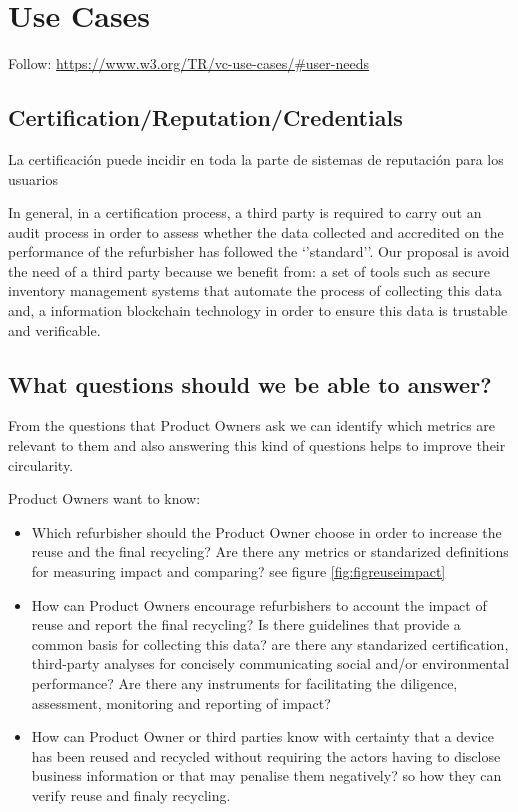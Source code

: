 \documentclass[
]{book}
\providecommand{\tightlist}{%
  \setlength{\itemsep}{0pt}\setlength{\parskip}{0pt}}
\begin{document}
\hypertarget{use-cases}{%
\section{Use Cases}\label{use-cases}}

Follow: \url{https://www.w3.org/TR/vc-use-cases/\#user-needs}

\hypertarget{certificationreputationcredentials}{%
\subsection{Certification/Reputation/Credentials}\label{certificationreputationcredentials}}

La certificación puede incidir en toda la parte de sistemas de reputación para los usuarios

In general, in a certification process, a third party is required to carry out an audit process in order to assess whether the data collected and accredited on the performance of the refurbisher has followed the `'standard''. Our proposal is avoid the need of a third party because we benefit from: a set of tools such as secure inventory management systems that automate the process of collecting this data and, a information blockchain technology in order to ensure this data is trustable and verificable.

\hypertarget{what-questions-should-we-be-able-to-answer}{%
\subsection{What questions should we be able to answer?}\label{what-questions-should-we-be-able-to-answer}}

From the questions that Product Owners ask we can identify which metrics are relevant to them and also answering this kind of questions helps to improve their circularity.

Product Owners want to know:

\begin{itemize}
\tightlist
\item
  Which refurbisher should the Product Owner choose in order to increase the reuse and the final recycling? Are there any metrics or standarized definitions for measuring impact and comparing? see figure \ref{fig:figreuseimpact}
\item
  How can Product Owners encourage refurbishers to account the impact of reuse and report the final recycling? Is there guidelines that provide a common basis for collecting this data? are there any standarized certification, third-party analyses for concisely communicating social and/or environmental performance? Are there any instruments for facilitating the diligence, assessment, monitoring and reporting of impact?
\item
  How can Product Owner or third parties know with certainty that a device has been reused and recycled without requiring the actors having to disclose business information or that may penalise them negatively? so how they can verify reuse and finaly recycling.
\end{itemize}
\end{document}
